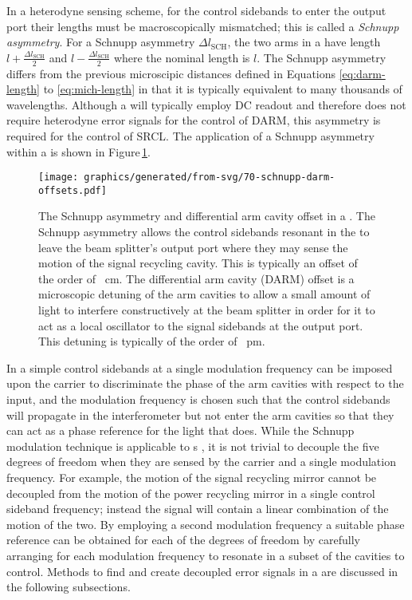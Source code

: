 In a heterodyne sensing scheme, for the control sidebands to enter the output port their lengths must be macroscopically mismatched; this is called a \emph{Schnupp asymmetry}. For a Schnupp asymmetry $\Delta l_{\text{SCH}}$, the two arms in a \MI{} have length $l + \frac{\Delta l_{\text{SCH}}}{2}$ and $l - \frac{\Delta l_{\text{SCH}}}{2}$ where the nominal length is $l$. The Schnupp asymmetry differs from the previous microscipic distances defined in Equations \ref{eq:darm-length} to \ref{eq:mich-length} in that it is typically equivalent to many thousands of wavelengths. Although a \DRFPMI{} will typically employ \gls{DC} readout and therefore does not require heterodyne error signals for the control of \gls{DARM}, this asymmetry is required for the control of \gls{SRCL}. The application of a Schnupp asymmetry within a \DRFPMI{} is shown in Figure\,\ref{fig:schnupp-darm-offsets}.

\begin{figure}
  \centering
  \texttt{[image: graphics/generated/from-svg/70-schnupp-darm-offsets.pdf]}
  \caption[Schnupp asymmetry and differential arm cavity offset in a \DRFPMI{}]{\label{fig:schnupp-darm-offsets}The Schnupp asymmetry and differential arm cavity offset in a \DRFPMI{}. The Schnupp asymmetry allows the control sidebands resonant in the \MI{} to leave the beam splitter's output port where they may sense the motion of the signal recycling cavity. This is typically an offset of the order of \SI{}{\centi\meter}. The differential arm cavity (\gls{DARM}) offset is a microscopic detuning of the arm cavities to allow a small amount of light to interfere constructively at the beam splitter in order for it to act as a local oscillator to the signal sidebands at the output port. This detuning is typically of the order of \SI{}{\pico\meter}.}
\end{figure}

In a simple \MI{} control sidebands at a single modulation frequency can be imposed upon the carrier to discriminate the phase of the arm cavities with respect to the input, and the modulation frequency is chosen such that the control sidebands will propagate in the interferometer but not enter the arm cavities so that they can act as a phase reference for the light that does. While the Schnupp modulation technique is applicable to \DRFPMI{}s \cite{Heinzel1998}, it is not trivial to decouple the five degrees of freedom when they are sensed by the carrier and a single modulation frequency. For example, the motion of the signal recycling mirror cannot be decoupled from the motion of the power recycling mirror in a single control sideband frequency; instead the signal will contain a linear combination of the motion of the two. By employing a second modulation frequency a suitable phase reference can be obtained for each of the degrees of freedom by carefully arranging for each modulation frequency to resonate in a subset of the cavities to control. Methods to find and create decoupled error signals in a \DRFPMI{} are discussed in the following subsections.

